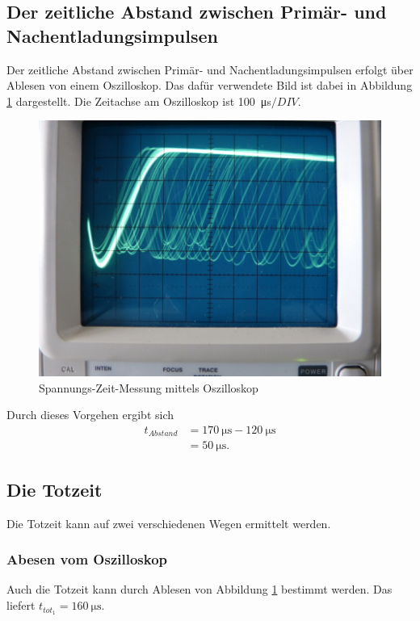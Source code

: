 \subsection{Der zeitliche Abstand zwischen Primär- und Nachentladungsimpulsen}
Der zeitliche Abstand zwischen Primär- und Nachentladungsimpulsen erfolgt über Ablesen von einem
Oszilloskop. Das dafür verwendete Bild ist dabei in Abbildung \ref{fig:Osz} dargestellt. Die Zeitachse
am Oszilloskop ist \SI{100}{\micro\second}$/DIV$.
\begin{figure}[H]
    \centering
    \includegraphics[scale=0.5]{content/Osz.png}
    \caption{Spannungs-Zeit-Messung mittels Oszilloskop}
    \label{fig:Osz}
  \end{figure}
Durch dieses Vorgehen ergibt sich
\begin{align*}
    t_{Abstand}&=\SI{170}{\micro\second}-\SI{120}{\micro\second}\\
               &=\SI{50}{\micro\second}.
\end{align*}

\subsection{Die Totzeit}
Die Totzeit kann auf zwei verschiedenen Wegen ermittelt werden.
\subsubsection*{Abesen vom Oszilloskop}
        Auch die Totzeit kann durch Ablesen von Abbildung \ref{fig:Osz} bestimmt werden. Das liefert
        $t_{tot_1}=\SI{160}{\micro\second}$.
